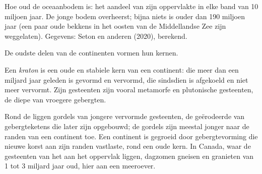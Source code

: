 \begin{omfigure}

{\small Hoe oud de oceaanbodem is: het aandeel van zijn oppervlakte in elke band van 10
miljoen jaar. De jonge bodem overheerst; bijna niets is ouder dan 190
miljoen jaar (een paar oude bekkens in het oosten van de Middellandse Zee zijn weggelaten).
Gegevens: Seton en anderen (2020), berekend.}
\end{omfigure}

De oudste delen van de continenten vormen hun kernen.

\begin{definition}[Kraton]\label{def:g12:continental-crust:craton}
Een \emph{kraton} is een oude en stabiele kern van een continent:
 die meer dan een miljard jaar geleden is gevormd en vervormd, die
sindsdien is afgekoeld en niet meer vervormt. Zijn gesteenten zijn vooral metamorfe en
plutonische gesteenten, de diepe  van vroegere gebergten.
\end{definition}

Rond de  liggen gordels van jongere vervormde gesteenten, de geërodeerde  van
gebergteketens die later zijn opgebouwd; de gordels zijn meestal jonger naar de randen
van een continent toe. Een continent is gegroeid door gebergtevorming die nieuwe
korst aan zijn randen vastlaste, rond een oude kern. In Canada, waar de gesteenten van het
 aan het oppervlak liggen, dagzomen gneisen en granieten van 1 tot 3 miljard jaar oud,
hier aan een meeroever.

